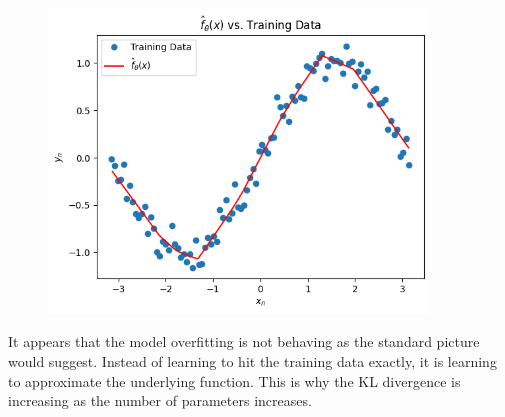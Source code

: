 \documentclass{article}
\begin{document}
\begin{figure}[H]
    \centering
    \includegraphics[width=0.9\textwidth]{figures/width20000.png}
\end{figure}

It appears that the model overfitting is not behaving as the standard picture would suggest.
Instead of learning to hit the training data exactly, it is learning to approximate the underlying function.
This is why the KL divergence is increasing as the number of parameters increases.
\end{document}
